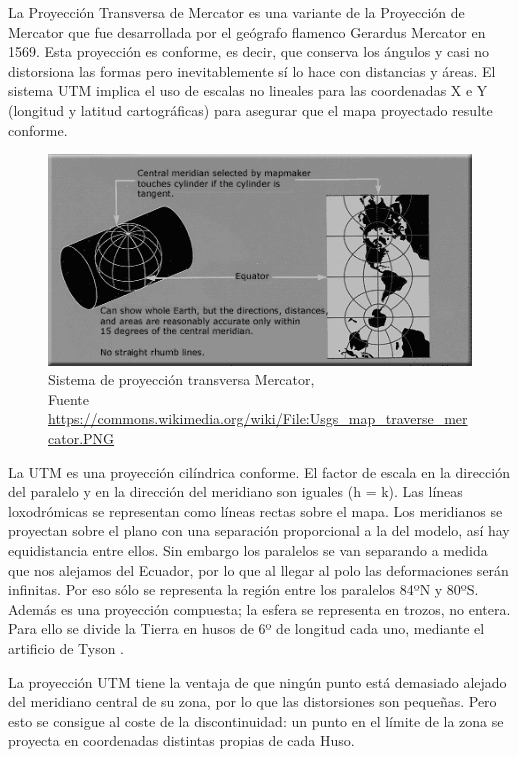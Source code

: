 La Proyección Transversa de Mercator es una variante de la Proyección de Mercator que fue desarrollada por el geógrafo flamenco Gerardus Mercator en 1569. Esta proyección es conforme, es decir, que conserva los ángulos y casi no distorsiona las formas pero inevitablemente sí lo hace con distancias y áreas. El sistema \ac{UTM} implica el uso de escalas no lineales para las coordenadas X e Y (longitud y latitud cartográficas) para asegurar que el mapa proyectado resulte conforme.

\begin{figure}[!htb]
  \centering
  \includegraphics[width=\textwidth]{06.radionavegacion/Imagenes/Usgs_map_traverse_mercator.png}
  \caption{\centering Sistema de proyecci\'on transversa Mercator, \\{\scriptsize Fuente \url{https://commons.wikimedia.org/wiki/File:Usgs_map_traverse_mercator.PNG}}}
  \label{fig:sistema.proyeccion.transversa.mercator}
\end{figure}

La UTM es una proyección cilíndrica conforme. El factor de escala en la dirección del paralelo y en la dirección del meridiano son iguales (h = k). Las líneas loxodrómicas se representan como líneas rectas sobre el mapa. Los meridianos se proyectan sobre el plano con una separación proporcional a la del modelo, así hay equidistancia entre ellos. Sin embargo los paralelos se van separando a medida que nos alejamos del Ecuador, por lo que al llegar al polo las deformaciones serán infinitas. Por eso sólo se representa la región entre los paralelos 84ºN y 80ºS. Además es una proyección compuesta; la esfera se representa en trozos, no entera. Para ello se divide la Tierra en husos de 6º de longitud cada uno, mediante el artificio de Tyson .

La proyección UTM tiene la ventaja de que ningún punto está demasiado alejado del meridiano central de su zona, por lo que las distorsiones son pequeñas. Pero esto se consigue al coste de la discontinuidad: un punto en el límite de la zona se proyecta en coordenadas distintas propias de cada Huso.

